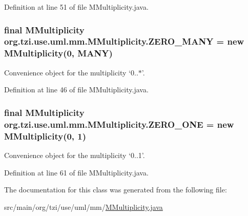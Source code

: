 Definition at line 51 of file M\-Multiplicity.\-java.

\hypertarget{classorg_1_1tzi_1_1use_1_1uml_1_1mm_1_1_m_multiplicity_aa8e47b2cffebf861497936c34fa386ca}{
\subsubsection[{Z\-E\-R\-O\-\_\-\-M\-A\-N\-Y}]{\setlength{\rightskip}{0pt plus 5cm}final {\bf M\-Multiplicity} org.\-tzi.\-use.\-uml.\-mm.\-M\-Multiplicity.\-Z\-E\-R\-O\-\_\-\-M\-A\-N\-Y = new {\bf M\-Multiplicity}(0, {\bf M\-A\-N\-Y})\hspace{0.3cm}{\ttfamily [static]}}}\label{classorg_1_1tzi_1_1use_1_1uml_1_1mm_1_1_m_multiplicity_aa8e47b2cffebf861497936c34fa386ca}
Convenience object for the multiplicity `0..$\ast$'. 

Definition at line 46 of file M\-Multiplicity.\-java.

\hypertarget{classorg_1_1tzi_1_1use_1_1uml_1_1mm_1_1_m_multiplicity_a42d0fe840b8a6a410ff3c5f1572a065f}{
\subsubsection[{Z\-E\-R\-O\-\_\-\-O\-N\-E}]{\setlength{\rightskip}{0pt plus 5cm}final {\bf M\-Multiplicity} org.\-tzi.\-use.\-uml.\-mm.\-M\-Multiplicity.\-Z\-E\-R\-O\-\_\-\-O\-N\-E = new {\bf M\-Multiplicity}(0, 1)\hspace{0.3cm}{\ttfamily [static]}}}\label{classorg_1_1tzi_1_1use_1_1uml_1_1mm_1_1_m_multiplicity_a42d0fe840b8a6a410ff3c5f1572a065f}
Convenience object for the multiplicity `0..1'. 

Definition at line 61 of file M\-Multiplicity.\-java.



The documentation for this class was generated from the following file\-:\begin{DoxyCompactItemize}
\item 
src/main/org/tzi/use/uml/mm/\hyperlink{_m_multiplicity_8java}{M\-Multiplicity.\-java}\end{DoxyCompactItemize}
